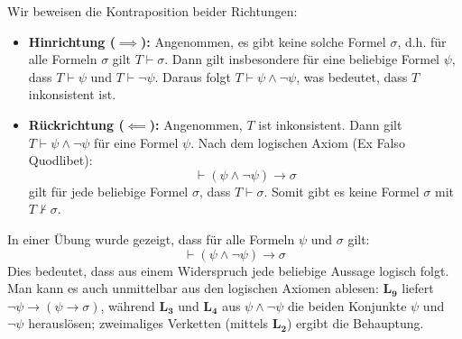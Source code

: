 \begin{math-stroke}

\begin{short-proof}
Wir beweisen die Kontraposition beider Richtungen:
\begin{itemize}
    \item \textbf{Hinrichtung ($\implies$):} Angenommen, es gibt keine solche Formel $\sigma$, d.h. für alle Formeln $\sigma$ gilt $T \vdash \sigma$. Dann gilt insbesondere für eine beliebige Formel $\psi$, dass $T \vdash \psi$ und $T \vdash \neg \psi$. Daraus folgt $T \vdash \psi \land \neg \psi$, was bedeutet, dass $T$ inkonsistent ist.
    \item \textbf{Rückrichtung ($\impliedby$):} Angenommen, $T$ ist inkonsistent. Dann gilt $T \vdash \psi \land \neg \psi$ für eine Formel $\psi$. Nach dem logischen Axiom (Ex Falso Quodlibet):
    \[ \vdash (\psi \land \neg \psi) \rightarrow \sigma \]
    gilt für jede beliebige Formel $\sigma$, dass $T \vdash \sigma$. Somit gibt es keine Formel $\sigma$ mit $T \not\vdash \sigma$.
\end{itemize}
\end{short-proof}

\begin{remark}
In einer Übung wurde gezeigt, dass für alle Formeln $\psi$ und $\sigma$ gilt:
\[ \vdash (\psi \land \neg \psi) \rightarrow \sigma \]
Dies bedeutet, dass aus einem Widerspruch jede beliebige Aussage logisch folgt. Man kann es auch unmittelbar aus den logischen Axiomen ablesen: $\mathbf{L_9}$ liefert $\neg\psi \rightarrow (\psi \rightarrow \sigma)$, während $\mathbf{L_3}$ und $\mathbf{L_4}$ aus $\psi \land \neg\psi$ die beiden Konjunkte $\psi$ und $\neg\psi$ herauslösen; zweimaliges Verketten (mittels $\mathbf{L_2}$) ergibt die Behauptung.
\end{remark}
\end{math-stroke}

